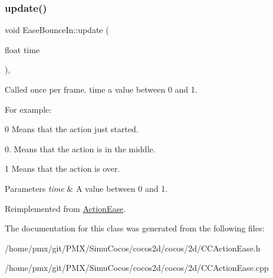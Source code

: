 \mbox{\label{classEaseBounceIn_a3b912af264515d06f8671179b17ae729}} 
\subsubsection{\texorpdfstring{update()}{update()}}
{\footnotesize\ttfamily void Ease\+Bounce\+In\+::update (\begin{DoxyParamCaption}\item[{float}]{time }\end{DoxyParamCaption})\hspace{0.3cm}{\ttfamily [override]}, {\ttfamily [virtual]}}

Called once per frame. time a value between 0 and 1.

For example\+:
\begin{DoxyItemize}
\item 0 Means that the action just started.
\item 0. Means that the action is in the middle.
\item 1 Means that the action is over.
\end{DoxyItemize}


\begin{DoxyParams}{Parameters}
{\em time} & A value between 0 and 1. \\
\hline
\end{DoxyParams}


Reimplemented from \hyperlink{classActionEase_a77679f09c02cf75fb54776470c339fc5}{Action\+Ease}.



The documentation for this class was generated from the following files\+:\begin{DoxyCompactItemize}
\item 
/home/pmx/git/\+P\+M\+X/\+Simu\+Cocos/cocos2d/cocos/2d/C\+C\+Action\+Ease.\+h\item 
/home/pmx/git/\+P\+M\+X/\+Simu\+Cocos/cocos2d/cocos/2d/C\+C\+Action\+Ease.\+cpp\end{DoxyCompactItemize}
